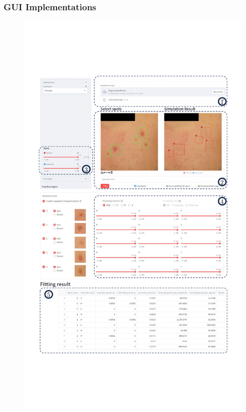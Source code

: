 \begin{spacing}{1.5}
\subsubsection{GUI Implementations}
\begin{figure}[t!]
    \centering
    \includegraphics[width=0.95\columnwidth]{Chapter3/GUI.pdf}

\end{figure}
\end{spacing}
